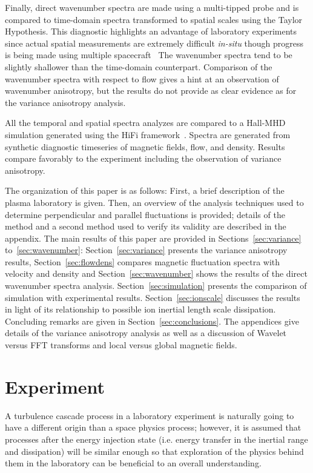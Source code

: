 \documentclass[aip,prl,amsmath,amssymb,reprint,superscriptaddress]{revtex4-1} %
\begin{document}
Finally, direct wavenumber spectra are made using a multi-tipped probe and is compared to time-domain spectra transformed to spatial scales using the Taylor Hypothesis. This diagnostic highlights an advantage of laboratory experiments since actual spatial measurements are extremely difficult {\it in-situ} though progress is being made using multiple spacecraft~\cite{sahraoui10}  The wavenumber spectra tend to be slightly shallower than the time-domain counterpart. Comparison of the wavenumber spectra with respect to flow gives a hint at an observation of wavenumber anisotropy, but the results do not provide as clear evidence as for the variance anisotropy analysis.

All the temporal and spatial spectra analyzes are compared to a Hall-MHD simulation generated using the HiFi framework~\cite{schaffner14a}. Spectra are generated from synthetic diagnostic timeseries of magnetic fields, flow, and density. Results compare favorably to the experiment including the observation of variance anisotropy.

The organization of this paper is as follows: First, a brief description of the plasma laboratory is given. Then, an overview of the analysis techniques used to determine perpendicular and parallel fluctuations is provided; details of the method and a second method used to verify its validity are described in the appendix. The main results of this paper are provided in Sections~\ref{sec:variance} to~\ref{sec:wavenumber}: Section~\ref{sec:variance} presents the variance anisotropy results, Section~\ref{sec:flowdens} compares magnetic fluctuation spectra with velocity and density and Section~\ref{sec:wavenumber} shows the results of the direct wavenumber spectra analysis. Section~\ref{sec:simulation} presents the comparison of simulation with experimental results. Section~\ref{sec:ionscale} discusses the results in light of its relationship to possible ion inertial length scale dissipation. Concluding remarks are given in Section~\ref{sec:conclusions}. The appendices give details of the variance anisotropy analysis as well as a discussion of Wavelet versus FFT transforms and local versus global magnetic fields.

\section{Experiment}\label{sec:experiment}

A turbulence cascade process in a laboratory experiment is naturally going to have a different origin than a space physics process; however, it is assumed that processes after the energy injection state (i.e. energy transfer in the inertial range and dissipation) will be similar enough so that exploration of the physics behind them in the laboratory can be beneficial to an overall understanding.
\end{document}
